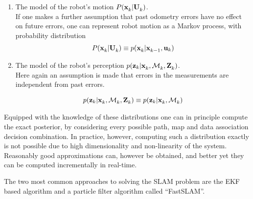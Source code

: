 \begin{enumerate}

\item The model of the robot's motion $P(\x{k}{}{} | \Uall{k}{})$. \\
If one makes a further assumption that past odometry errors have no
effect on future errors, one can represent robot motion as a Markov
process, with probability distribution 
\begin{equation}
 P(\x{k}{}{} | \Uall{k}{}) \equiv p(\x{k}{}{}| \x{k-1}{}{}, \U{k})
\end{equation}


\item The model of the robot's perception
$p(\z{k}| \x{k}{}{},\map{k}{}{}, \Zall{k}{})$.\\
Here again an assumption is made that errors in the measurements are
independent from past errors.


\begin{equation}
p(\z{k}| \x{k}{}{},\map{k}{}{}, \Zall{k}{}) \equiv 
  p(\z{k}| \x{k}{}{},\map{k}{}{})
\end{equation}


\end{enumerate}

Equipped with the knowledge of these distributions one can in
principle compute the exact posterior, by considering every possible
path, map and data association decision combination. In practice,
however, computing such a distribution exactly is not possible due to
high dimensionality and non-linearity of the system. Reasonably good
approximations can, however be obtained, and better yet they can be
computed incrementally in real-time.

The two most common approaches to solving the SLAM problem are the EKF
based algorithm and a particle filter algorithm called ``FastSLAM''.

